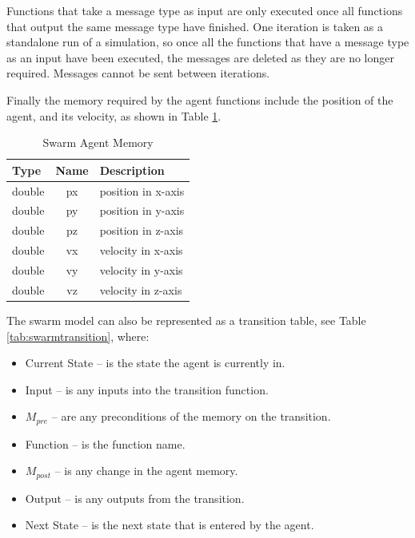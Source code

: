 Functions that take a message type as input are only executed once all functions
that output the same message type have finished. One iteration is taken as a
standalone run of a simulation, so once all the functions that have a message
type as an input have been executed, the messages are deleted as they are no
longer required. Messages cannot be sent between iterations.

Finally the memory required by the agent functions include the position of the
agent, and its velocity, as shown in Table \ref{tab:swarm_memory}.

\begin{table}[ht]
\centering
\begin{tabular}{|l||c||l|}
\hline
Type&Name&Description\\
\hline \hline
double&px&position in x-axis\\
\hline
double&py&position in y-axis\\
\hline
double&pz&position in z-axis\\
\hline
double&vx&velocity in x-axis\\
\hline
double&vy&velocity in y-axis\\
\hline
double&vz&velocity in z-axis\\
\hline
\end{tabular}
\caption{Swarm Agent Memory}
\label{tab:swarm_memory}
\end{table}

The swarm model can also be represented as a transition table, see Table
\ref{tab:swarmtransition}, where:

\begin{itemize}
  \item Current State -- is the state the agent is currently in.
  \item Input -- is any inputs into the transition function.
  \item $M_{pre}$ -- are any preconditions of the memory on the transition.
  \item Function -- is the function name.
  \item $M_{post}$ -- is any change in the agent memory.
  \item Output -- is any outputs from the transition.
  \item Next State -- is the next state that is entered by the agent.
\end{itemize}

